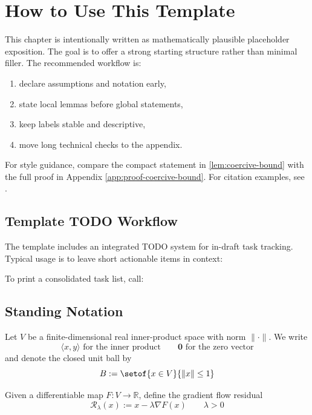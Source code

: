 \section{How to Use This Template}
\label{sec:template-workflow}

This chapter is intentionally written as mathematically plausible placeholder exposition. The goal is to offer a strong starting structure rather than minimal filler. The recommended workflow is:
\begin{enumerate}
    \item declare assumptions and notation early,
    \item state local lemmas before global statements,
    \item keep labels stable and descriptive,
    \item move long technical checks to the appendix.
\end{enumerate}

For style guidance, compare the compact statement in \cref{lem:coercive-bound} with the full proof in Appendix \ref{app:proof-coercive-bound}. For citation examples, see \cite{rudin1976principles,evans2010pde}.

\subsection{Template TODO Workflow}
\label{ssec:template-todos}

The template includes an integrated TODO system for in-draft task tracking.
Typical usage is to leave short actionable items in context:

To print a consolidated task list, call:
\listoftodos

\subsection{Standing Notation}
\label{ssec:standing-notation}

Let $V$ be a finite-dimensional real inner-product space with norm $\|\cdot\|$. We write
\[
\langle x,y\rangle \text{ for the inner product} \qquad \mathbf{0} \text{ for the zero vector}
\]
and denote the closed unit ball by
\[
B:=\setof{x\in V}{\|x\|\le 1}
\]

Given a differentiable map $F:V\to\mathbb{R}$, define the gradient flow residual
\begin{equation}
\label{eq:residual}
\mathcal{R}_\lambda(x):=x-\lambda\nabla F(x)\qquad \lambda>0
\end{equation}


